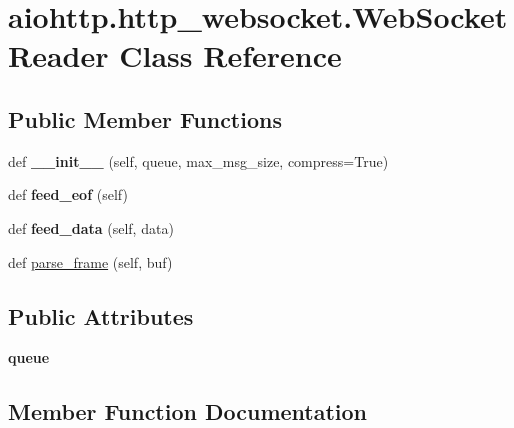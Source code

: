 \hypertarget{classaiohttp_1_1http__websocket_1_1_web_socket_reader}{}\section{aiohttp.\+http\+\_\+websocket.\+Web\+Socket\+Reader Class Reference}
\label{classaiohttp_1_1http__websocket_1_1_web_socket_reader}
\subsection*{Public Member Functions}
\begin{DoxyCompactItemize}
\item 
\mbox{\label{classaiohttp_1_1http__websocket_1_1_web_socket_reader_a98eeb4ae83f5cc0cc8abead51da3c23c}} 
def {\bfseries \+\_\+\+\_\+init\+\_\+\+\_\+} (self, queue, max\+\_\+msg\+\_\+size, compress=True)
\item 
\mbox{\label{classaiohttp_1_1http__websocket_1_1_web_socket_reader_a5f9b7c1ac5b4e6197d8af3491b3bee1d}} 
def {\bfseries feed\+\_\+eof} (self)
\item 
\mbox{\label{classaiohttp_1_1http__websocket_1_1_web_socket_reader_ad373dff07bb2510a2894d047387c7bd6}} 
def {\bfseries feed\+\_\+data} (self, data)
\item 
def \hyperlink{classaiohttp_1_1http__websocket_1_1_web_socket_reader_a2a96935f57365d13339b05d447d7201f}{parse\+\_\+frame} (self, buf)
\end{DoxyCompactItemize}
\subsection*{Public Attributes}
\begin{DoxyCompactItemize}
\item 
\mbox{\label{classaiohttp_1_1http__websocket_1_1_web_socket_reader_a09d2648a1cab312c94a56afd422cd685}} 
{\bfseries queue}
\end{DoxyCompactItemize}


\subsection{Member Function Documentation}
\mbox{\label{classaiohttp_1_1http__websocket_1_1_web_socket_reader_a2a96935f57365d13339b05d447d7201f}} 
